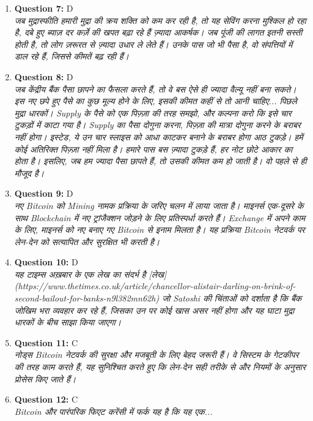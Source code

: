 \documentclass[12pt,a4paper]{article}
\begin{document}
\begin{enumerate}
\item \textbf{Question 7:} D
\\ \textit{जब मुद्रास्फीति हमारी मुद्रा की क्रय शक्ति को कम कर रही है, तो यह
सेविंग करना मुश्किल हो रहा है, दबे हुए ब्याज़ दर कर्ज़े की खपत बढ़ा रहे हैं
ज़्यादा आकर्षक। जब पूंजी की लागत इतनी सस्ती होती है, तो लोग ज़रूरत से ज़्यादा उधार ले लेते हैं।
उनके पास जो भी पैसा है, वो संपत्तियों में डाल रहे हैं, जिससे कीमतें बढ़ रही हैं।}

\item \textbf{Question 8:} D
\\ \textit{जब केंद्रीय बैंक पैसा छापने का फैसला करते हैं, तो वे बस ऐसे ही ज्यादा वैल्यू नहीं बना सकते।
इस नए छपे हुए पैसे का कुछ मूल्य होने के लिए, इसकी कीमत कहीं से तो आनी चाहिए...
पिछले मुद्रा धारकों।
Supply के पैसे को एक पिज़्ज़ा की तरह समझो, और कल्पना करो कि इसे चार टुकड़ों में काटा गया है।
Supply का पैसा दोगुना करना, पिज़्ज़ा की मात्रा दोगुना करने के बराबर नहीं होगा।
इस्टेड, ये उन चार स्लाइस को आधा काटकर बनाने के बराबर होगा
आठ टुकड़े। हमें कोई अतिरिक्त पिज़्ज़ा नहीं मिला है। हमारे पास बस ज़्यादा टुकड़े हैं,
हर नोट छोटे आकार का होता है। इसलिए, जब हम ज्यादा पैसा छापते हैं, तो उसकी कीमत कम हो जाती है।
वो पहले से ही मौजूद है।}

\item \textbf{Question 9:} D
\\ \textit{नए Bitcoin को Mining नामक प्रक्रिया के जरिए चलन में लाया जाता है।
माइनर्स एक-दूसरे के साथ Blockchain में नए ट्रांजैक्शन जोड़ने के लिए प्रतिस्पर्धा करते हैं।
Exchange में अपने काम के लिए, माइनर्स को नए बनाए गए Bitcoin से इनाम मिलता है।
यह प्रक्रिया Bitcoin नेटवर्क पर लेन-देन को सत्यापित और सुरक्षित भी करती है।}

\item \textbf{Question 10:} D
\\ \textit{यह टाइम्स अख़बार के एक लेख का संदर्भ है [लेख](https://www.thetimes.co.uk/article/chancellor-alistair-darling-on-brink-of-second-bailout-for-banks-n9l382mn62h) जो Satoshi की चिंताओं को दर्शाता है कि बैंक जोखिम भरा व्यवहार कर रहे हैं, जिसका उन पर कोई खास असर नहीं होगा और यह घाटा मुद्रा धारकों के बीच साझा किया जाएगा।}

\item \textbf{Question 11:} C
\\ \textit{नोड्स Bitcoin नेटवर्क की सुरक्षा और मजबूती के लिए बेहद जरूरी हैं।
वे सिस्टम के गेटकीपर की तरह काम करते हैं, यह सुनिश्चित करते हुए कि लेन-देन
सही तरीके से और नियमों के अनुसार प्रोसेस किए जाते हैं।}

\item \textbf{Question 12:} C
\\ \textit{Bitcoin और पारंपरिक फिएट करेंसी में फर्क यह है कि यह एक...}


\end{enumerate}
\end{document}
